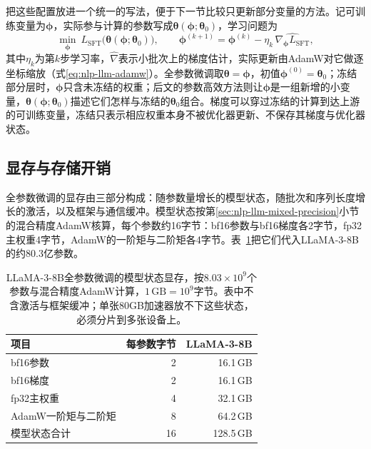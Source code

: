 把这些配置放进一个统一的写法，便于下一节比较只更新部分变量的方法。记可训练变量为$\bm\phi$，实际参与计算的参数写成$\bm\theta(\bm\phi;\bm\theta_0)$，学习问题为
\begin{equation}
 \min_{\bm\phi}\ L_{\mathrm{SFT}}\bigl(\bm\theta(\bm\phi;\bm\theta_0)\bigr),
 \qquad
 \bm\phi^{(k+1)}=\bm\phi^{(k)}-\eta_k\,\widehat{\nabla_{\bm\phi}L_{\mathrm{SFT}}},
 \label{eq:nlp-sft-param-map}
\end{equation}
其中$\eta_k$为第$k$步学习率，$\widehat{\nabla}$表示小批次上的梯度估计，实际更新由AdamW对它做逐坐标缩放（式\eqref{eq:nlp-llm-adamw}）。全参数微调取$\bm\theta=\bm\phi$，初值$\bm\phi^{(0)}=\bm\theta_0$；冻结部分层时，$\bm\phi$只含未冻结的权重；后文的参数高效方法则让$\bm\phi$是一组新增的小变量，$\bm\theta(\bm\phi;\bm\theta_0)$描述它们怎样与冻结的$\bm\theta_0$组合。梯度可以穿过冻结的计算到达上游的可训练变量，冻结只表示相应权重本身不被优化器更新、不保存其梯度与优化器状态。

\subsection{显存与存储开销}
\label{sec:nlp-sft-full-memory}

全参数微调的显存由三部分构成：随参数量增长的模型状态，随批次和序列长度增长的激活，以及框架与通信缓冲。模型状态按第\ref{sec:nlp-llm-mixed-precision}小节的混合精度AdamW核算，每个参数约16字节：bf16参数与bf16梯度各2字节，fp32主权重4字节，AdamW的一阶矩与二阶矩各4字节。表~\ref{tab:nlp-sft-full-memory}把它们代入LLaMA-3-8B的约80.3亿参数。

\begin{table}[htbp]
  \centering
  \small
  \begin{tabular}{@{}lrr@{}}
    \toprule
    项目 & 每参数字节 & LLaMA-3-8B\\
    \midrule
    bf16参数 & 2 & 16.1\,GB\\
    bf16梯度 & 2 & 16.1\,GB\\
    fp32主权重 & 4 & 32.1\,GB\\
    AdamW一阶矩与二阶矩 & 8 & 64.2\,GB\\
    \midrule
    模型状态合计 & 16 & 128.5\,GB\\
    \bottomrule
  \end{tabular}
  \caption{LLaMA-3-8B全参数微调的模型状态显存，按$8.03\times10^9$个参数与混合精度AdamW计算，$1\,\mathrm{GB}=10^9$字节。表中不含激活与框架缓冲；单张80GB加速器放不下这些状态，必须分片到多张设备上。}
  \label{tab:nlp-sft-full-memory}
\end{table}

